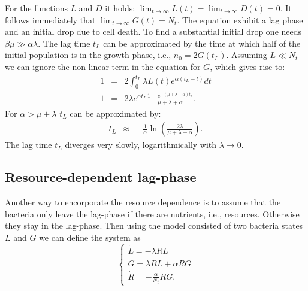 \documentclass[10pt,A4paper]{article}
\begin{document}
For the functions $L$ and $D$ it holds: $\lim_{t\to\infty} L(t) = \lim_{t\to\infty} D(t) = 0$. 
It follows immediately that $\lim_{t\to\infty} G(t) = N_t$. 
The equation exhibit a lag phase and an initial drop due to cell death. 
To find a substantial initial drop one needs $\beta \mu \gg \alpha \lambda$. 
The lag time $t_L$ can be approximated by the time at which half of the initial population is in the growth phase, i.e., $n_0=2G(t_L)$. 
Assuming $L\ll N_t$ we can ignore the non-linear term in the equation for $G$, which gives rise to:
\begin{eqnarray}
1&=& 2\int_0^{t_L} \lambda L(t)e^{\alpha(t_L-t)}dt\\
1  &=& 2\lambda e^{\alpha t_L}\frac{1-e^{-(\mu+\lambda+\alpha)t_L}}{\mu+\lambda+\alpha}.
\end{eqnarray}
For $\alpha > \mu+\lambda$ $t_L$ can be approximated by:
\begin{eqnarray}
t_L &\approx& -\frac{1}{\alpha}\ln\left(\frac{2\lambda}{\mu+\lambda+\alpha}\right).
\end{eqnarray}
The lag time $t_L$ diverges very slowly, logarithmically with $\lambda\to 0$.

\subsection{Resource-dependent lag-phase}

Another way to encorporate the resource dependence is to assume that the bacteria only leave the lag-phase if there are nutrients, i.e., resources. 
Otherwise they stay in the lag-phase.
Then using the model consisted of two bacteria states $L$ and $G$ we can define the system as
\begin{equation}
    \begin{cases}
        \dot{L} = - \lambda R L\\
        \dot{G} = \lambda R L +\alpha R G\\
        \dot{R} =-\frac{\alpha}{N_t} R G.
    \end{cases}
\end{equation}
\end{document}
